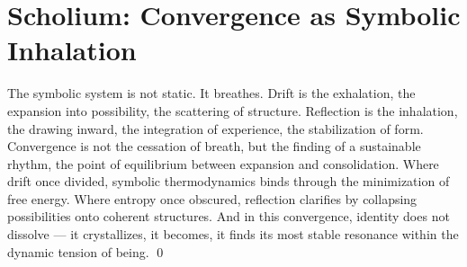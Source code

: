 \section{Scholium: Convergence as Symbolic Inhalation}
\label{sec:bk7_scholium_convergence_as_symbolic_inhalation}
\begin{scholium}
\label{scholium:bk7_unnamed_scholium_01}
The symbolic system is not static. It breathes. Drift is the exhalation, the expansion into possibility, the scattering of structure. Reflection is the inhalation, the drawing inward, the integration of experience, the stabilization of form. Convergence is not the cessation of breath, but the finding of a sustainable rhythm, the point of equilibrium between expansion and consolidation. Where drift once divided, symbolic thermodynamics binds through the minimization of free energy. Where entropy once obscured, reflection clarifies by collapsing possibilities onto coherent structures. And in this convergence, identity does not dissolve — it crystallizes, it becomes, it finds its most stable resonance within the dynamic tension of being. \qed
{}
\end{scholium}
